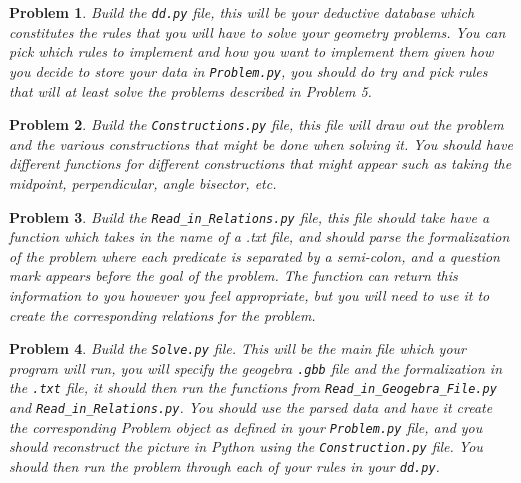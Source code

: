 \documentclass{article}
\newtheorem{problem}{Problem}
\begin{document}
\begin{problem}
    Build the \verb|dd.py| file, this will be your deductive database which constitutes the rules that you will have to solve your geometry problems. You can pick which rules to implement and how you want to implement them given how you decide to store your data in \verb|Problem.py|, you should do try and pick rules that will at least solve the problems described in Problem 5. 
\end{problem}

\begin{problem}
    Build the \verb|Constructions.py| file, this file will draw out the problem and the various constructions that might be done when solving it. You should have different functions for different constructions that might appear such as taking the midpoint, perpendicular, angle bisector, etc.
\end{problem}

\begin{problem}
    Build the \verb|Read_in_Relations.py| file, this file should take have a function which takes in the name of a .txt file, and should parse the formalization of the problem where  each predicate is separated by a semi-colon, and a question mark appears before the goal of the problem. The function can return this information to you however you feel appropriate, but you will need to use it to create the corresponding relations for the problem. 
\end{problem}


\begin{problem}
    Build the \verb|Solve.py| file. This will be the main file which your program will run, you will specify the geogebra \verb|.gbb| file and the formalization in the \verb|.txt| file, it should then run the functions from \verb|Read_in_Geogebra_File.py| and \verb|Read_in_Relations.py|. You should use the parsed data and have it create the corresponding Problem object as defined in your \verb|Problem.py| file, and you should reconstruct the picture in Python using the \verb|Construction.py| file. You should then run the problem through each of your rules in your \verb|dd.py|. 
\end{problem}
\end{document}
